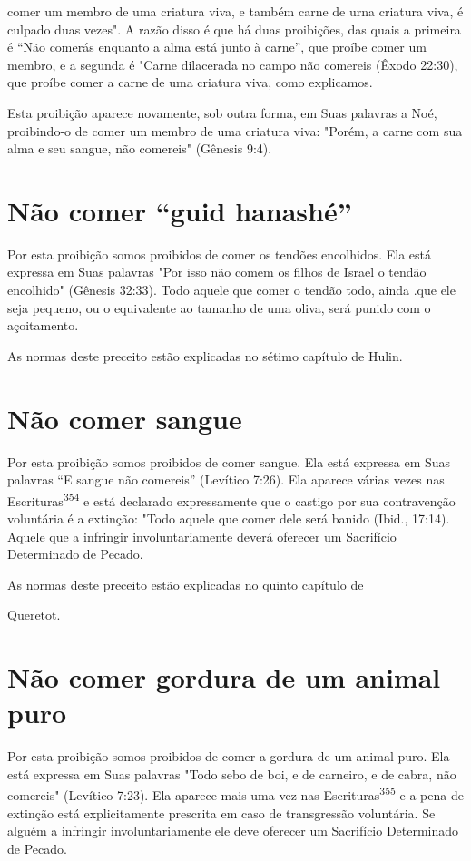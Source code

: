 comer um membro de uma criatura viva, e também carne de urna criatura
vi­va, é culpado duas vezes". A razão disso é que há duas proibições,
das quais a primeira é ``Não comerás enquanto a alma está junto à carne'',
que proíbe comer um membro, e a segunda é "Carne dilacerada no campo não
come­reis (Êxodo 22:30), que proíbe comer a carne de uma criatura viva,
como explicamos.

Esta proibição aparece novamente, sob outra forma, em Suas pala­vras a
Noé, proibindo-o de comer um membro de uma criatura viva: "Porém, a
carne com sua alma e seu sangue, não comereis" (Gênesis 9:4).

\section{Não comer ``guid hanashé''}

Por esta proibição somos proibidos de comer os tendões encolhi­dos. Ela
está expressa em Suas palavras "Por isso não comem os filhos de Israel o
tendão encolhido" (Gênesis 32:33). Todo aquele que comer o tendão todo,
ainda .que ele seja pequeno, ou o equivalente ao tamanho de uma oliva,
será punido com o açoitamento.


As normas deste preceito estão explicadas no sétimo capítulo de Hulin.


\section{Não comer sangue}

Por esta proibição somos proibidos de comer sangue. Ela está ex­pressa
em Suas palavras ``E sangue não comereis'' (Levítico 7:26). Ela aparece
várias vezes nas Escrituras\textsuperscript{354} e está declarado
expressamente que o castigo por sua contravenção voluntária é a
extinção: "Todo aquele que comer dele será banido (Ibid., 17:14). Aquele
que a infringir involuntariamente deverá oferecer um Sacrifício
Determinado de Pecado.


As normas deste preceito estão explicadas no quinto capítulo de


Queretot.

\section{Não comer gordura de um animal puro}

Por esta proibição somos proibidos de comer a gordura de um ani­mal
puro. Ela está expressa em Suas palavras "Todo sebo de boi, e de
carneiro, e de cabra, não comereis" (Levítico 7:23). Ela aparece mais
uma vez nas Escrituras\textsuperscript{355} e a pena de extinção está
explicitamente prescrita em caso de transgressão voluntária. Se alguém a
infringir involuntariamente ele deve ofe­recer um Sacrifício Determinado
de Pecado.


